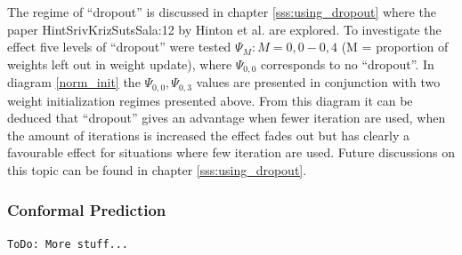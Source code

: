 The regime of ``dropout'' is discussed in chapter \ref{sss:using_dropout} where the paper \cite{art}{HintSrivKrizSutsSala:12} by Hinton et al. are explored. To investigate the effect five levels of ``dropout'' were tested $\Psi_{M} : M = {0,0 - 0,4}$ (M = proportion of weights left out in weight update), where $\Psi_{0,0}$ corresponds to no ``dropout''.  In diagram \ref{norm_init} the $\Psi_{0,0}, \Psi_{0,3}$ values are presented in conjunction with two weight initialization regimes presented above. From this diagram it can be deduced that ``dropout'' gives an advantage when fewer iteration are used, when the amount of iterations is increased the effect fades out but has clearly a favourable effect for situations where few iteration are used. Future discussions on this topic can be found in chapter \ref{sss:using_dropout}.




\subsubsection{Conformal Prediction} \label{sss:conformal_prediction}
\texttt{ToDo: More stuff...}

